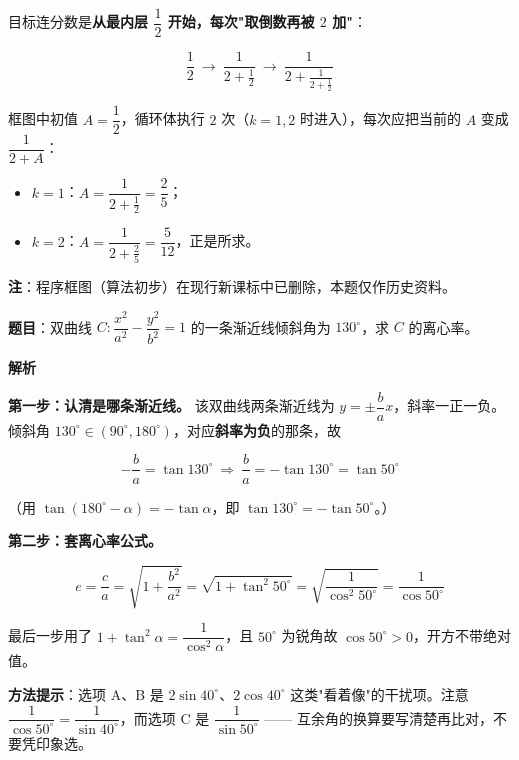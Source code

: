 目标连分数是\textbf{从最内层 $\dfrac12$ 开始，每次"取倒数再被 $2$ 加"}：

\[\frac12\ \longrightarrow\ \frac1{2+\frac12}\ \longrightarrow\ \frac1{2+\frac1{2+\frac12}}\]

框图中初值 $A=\dfrac12$，循环体执行 $2$ 次（$k=1,2$ 时进入），每次应把当前的 $A$ 变成 $\dfrac1{2+A}$：

\begin{itemize}
\item $k=1$：$A=\dfrac1{2+\frac12}=\dfrac25$；
\item $k=2$：$A=\dfrac1{2+\frac25}=\dfrac5{12}$，正是所求。
\end{itemize}


\begin{gktip}
\textbf{注}：程序框图（算法初步）在现行新课标中已删除，本题仅作历史资料。
\end{gktip}

\par\medskip


\textbf{题目}：双曲线 $C:\dfrac{x^{2}}{a^{2}}-\dfrac{y^{2}}{b^{2}}=1$ 的一条渐近线倾斜角为 $130^\circ$，求 $C$ 的离心率。

\textbf{解析}

\textbf{第一步：认清是哪条渐近线。} 该双曲线两条渐近线为 $y=\pm\dfrac ba x$，斜率一正一负。倾斜角 $130^\circ\in(90^\circ,180^\circ)$，对应\textbf{斜率为负}的那条，故

\[-\frac ba=\tan130^\circ\ \Longrightarrow\ \frac ba=-\tan130^\circ=\tan50^\circ\]

（用 $\tan(180^\circ-\alpha)=-\tan\alpha$，即 $\tan130^\circ=-\tan50^\circ$。）

\textbf{第二步：套离心率公式。}

\[e=\frac ca=\sqrt{1+\frac{b^{2}}{a^{2}}}=\sqrt{1+\tan^{2}50^\circ}=\sqrt{\frac1{\cos^{2}50^\circ}}=\frac1{\cos50^\circ}\]

最后一步用了 $1+\tan^{2}\alpha=\dfrac1{\cos^{2}\alpha}$，且 $50^\circ$ 为锐角故 $\cos50^\circ>0$，开方不带绝对值。


\begin{gktip}
\textbf{方法提示}：选项 A、B 是 $2\sin40^\circ$、$2\cos40^\circ$ 这类"看着像"的干扰项。注意 $\dfrac1{\cos50^\circ}=\dfrac1{\sin40^\circ}$，而选项 C 是 $\dfrac1{\sin50^\circ}$ —— 互余角的换算要写清楚再比对，不要凭印象选。
\end{gktip}

